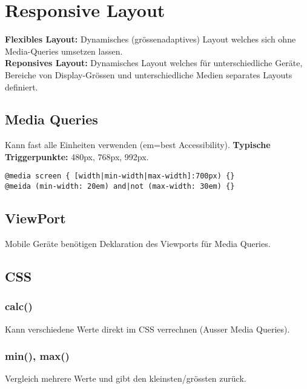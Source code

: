 
\section{Responsive Layout}
\textbf{Flexibles Layout:} Dynamisches (grössenadaptives) Layout welches sich ohne Media-Queries umsetzen lassen. \\
\textbf{Reponsives Layout:} Dynamisches Layout welches für unterschiedliche Geräte, Bereiche von Display-Grössen und unterschiedliche Medien separates Layouts definiert.

\subsection{Media Queries}
Kann fast alle Einheiten verwenden (em=best Accessibility). \textbf{Typische Triggerpunkte:} 480px, 768px, 992px.

\begin{lstlisting}[style=htmlcssjs]
@media screen { [width|min-width|max-width]:700px) {}
@meida (min-width: 20em) and|not (max-width: 30em) {}
\end{lstlisting}

\subsection{ViewPort}
Mobile Geräte benötigen Deklaration des Viewports für Media Queries.

\subsection{CSS}
\subsubsection{calc()}
Kann verschiedene Werte direkt im CSS verrechnen (Ausser Media Queries).
\subsubsection{min(), max()}
Vergleich mehrere Werte und gibt den kleinsten/grössten zurück.
